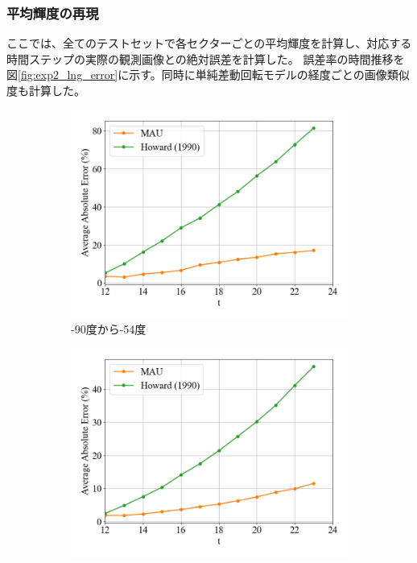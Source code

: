         \subsubsection{平均輝度の再現}
          ここでは、全てのテストセットで各セクターごとの平均輝度を計算し、対応する時間ステップの実際の観測画像との絶対誤差を計算した。
            誤差率の時間推移を図\ref{fig:exp2_lng_error}に示す。同時に単純差動回転モデルの経度ごとの画像類似度も計算した。
            \begin{figure}[htbp]
              \begin{subfigure}{0.5\textwidth}
                \centering
                \includegraphics[width=\textwidth]{figures/exp2/lng_error_1.png}
                \caption{-90度から-54度}
              \end{subfigure}%
              \begin{subfigure}{0.5\textwidth}
                \centering
                \includegraphics[width=\textwidth]{figures/exp2/lng_error_2.png}

\end{subfigure}
\end{figure}
